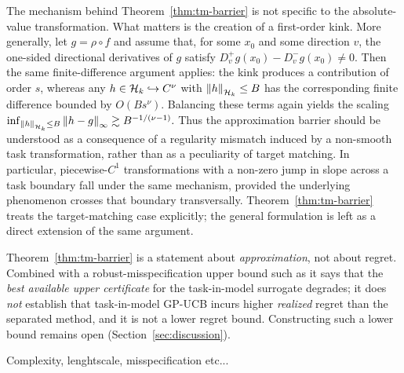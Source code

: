 \begin{remark}
The mechanism behind Theorem~\ref{thm:tm-barrier} is not specific to the absolute-value transformation. What matters is the creation of a first-order kink. More generally, let $g=\rho\circ f$ and assume that, for some $x_0$ and some direction $v$, the one-sided directional derivatives of $g$ satisfy $D_v^+ g(x_0)-D_v^- g(x_0)\neq 0.$ Then the same finite-difference argument applies: the kink produces a contribution of order $s$, whereas any $h\in\mathcal{H}_k\hookrightarrow C^\nu$ with $\left\lVert h\right\rVert_{\mathcal{H}_k}\le B$ has the corresponding finite difference bounded by $O(Bs^\nu)$. Balancing these terms again yields the scaling $\inf_{\left\lVert h\right\rVert_{\mathcal{H}_k}\le B}\left\lVert h-g\right\rVert_\infty
\gtrsim B^{-1/(\nu-1)}.$ Thus the approximation barrier should be understood as a consequence of a regularity mismatch induced by a non-smooth task transformation, rather than as a peculiarity of target matching. In particular, piecewise-$C^1$ transformations with a non-zero jump in slope across a task boundary fall under the same mechanism, provided the underlying phenomenon crosses that boundary transversally. Theorem~\ref{thm:tm-barrier} treats the target-matching case explicitly; the general formulation is left as a direct extension of the same argument.
\end{remark}


\begin{remark}
Theorem~\ref{thm:tm-barrier} is a statement about \emph{approximation}, not about
regret. Combined with a robust-misspecification upper bound such as
\cite{bogunovic2021} it says that the \emph{best available upper certificate} for
the task-in-model surrogate degrades; it does \emph{not} establish that
task-in-model GP-UCB incurs higher \emph{realized} regret than the separated
method, and it is not a lower regret bound. Constructing such a lower bound
remains open (Section~\ref{sec:discussion}).
\end{remark}

\begin{remark}{Complexity, lenghtscale, misspecification etc...}
    
\end{remark}


